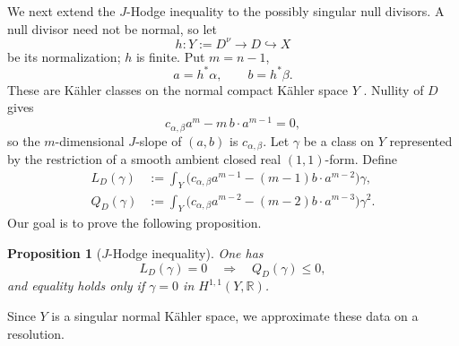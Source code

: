 \documentclass[reqno]{amsart}
\newcommand{\R}{\mathbb{R}}
\newcommand{\cab}{c_{\alpha,\beta}}
\theoremstyle{plain}
\newtheorem{proposition}[thm]{Proposition}
\theoremstyle{remark}
\begin{document}
We next extend the $J$-Hodge inequality to the possibly singular null
divisors. A null divisor need not be normal, so let
\[
 h:Y:=D^\nu\longrightarrow D\hookrightarrow X
\]
be its normalization; $h$ is finite. Put $m=n-1$,
\[
 a=h^*\alpha,\qquad b=h^*\beta.
\]
These are K\"ahler classes on the normal compact K\"ahler space $Y$
\cite[Proposition~3.5]{GK20}. Nullity of $D$ gives
\begin{equation}\label{eq:normalized-slope}
 \cab a^m-m\,b\cdot a^{m-1}=0,
\end{equation}
so the $m$-dimensional $J$-slope of $(a,b)$ is $\cab$.
Let $\gamma$ be a class on $Y$ represented by the restriction of a
smooth ambient closed real $(1,1)$-form. Define
\begin{align}
 L_D(\gamma)
&:=\int_Y
 \bigl(\cab a^{m-1}
 -(m-1)b\cdot a^{m-2}\bigr)\gamma,
\label{eq:L-D}\\
 Q_D(\gamma)
&:=\int_Y
 \bigl(\cab a^{m-2}
 -(m-2)b\cdot a^{m-3}\bigr)\gamma^2.
\label{eq:Q-D}
\end{align}
Our goal is to prove the following proposition.
\begin{proposition}[$J$-Hodge inequality]
    \label{prop:strict-hodge}
One has
\[
 L_D(\gamma)=0\quad\Longrightarrow\quad Q_D(\gamma)\leq0,
\]
and equality holds only if $\gamma=0$ in
$H^{1,1}(Y,\R)$.
\end{proposition}

Since $Y$ is a singular normal K\"ahler space, we approximate these
data on a resolution.
\end{document}
